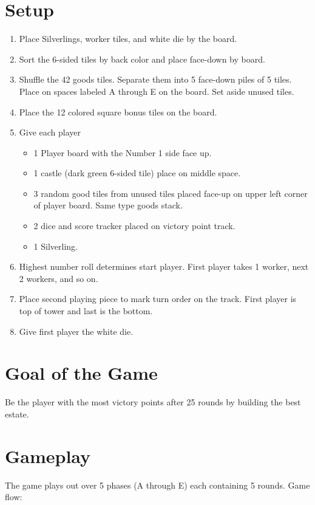 \documentclass[12pt]{article}
\newenvironment{enumerateCustom}
{\begin{enumerate}
  \setlength{\itemsep}{1pt}
  \setlength{\parskip}{0pt}
  \setlength{\parsep}{0pt}}
{\end{enumerate}}
\newenvironment{itemizeCustom}
{\begin{itemize}
  \setlength{\itemsep}{1pt}
  \setlength{\parskip}{0pt}
  \setlength{\parsep}{0pt}}
{\end{itemize}}
\begin{document}
\begin{multicols*}{2}

\section*{Setup}
\begin{enumerateCustom}
	\item Place Silverlings, worker tiles, and white die by the board.
	\item Sort the 6-sided tiles by back color and place face-down by board.
	\item Shuffle the 42 goods tiles. Separate them into 5 face-down piles of 5 tiles. Place on spaces labeled A through E on the board. Set aside unused tiles.
	\item Place the 12 colored square bonus tiles on the board.
	\item Give each player
		\begin{itemizeCustom}
			\item 1 Player board with the Number 1 side face up.
			\item 1 castle (dark green 6-sided tile) place on middle space.
			\item 3 random good tiles from unused tiles placed face-up on upper left corner of player board. Same type goods stack.
			\item 2 dice and score tracker placed on victory point track.
			\item 1 Silverling.
		\end{itemizeCustom}
	\item Highest number roll determines start player. First player takes 1 worker, next 2 workers, and so on. 
	\item Place second playing piece to mark turn order on the track. First player is top of tower and last is the bottom.
	\item Give first player the white die.
\end{enumerateCustom}
\section*{Goal of the Game}
Be the player with the most victory points after 25 rounds by building the best estate.
\section*{Gameplay}
The game plays out over 5 phases (A through E) each containing 5 rounds. Game flow:


\end{multicols*}
\end{document}
